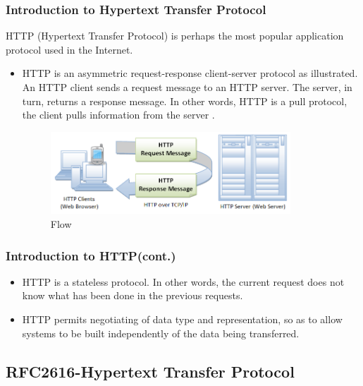 \documentclass{beamer}
\begin{document}
\begin{frame}
\frametitle{Introduction to Hypertext Transfer Protocol}
HTTP (Hypertext Transfer Protocol) is perhaps the most popular application protocol used in the Internet.\\


\begin{itemize}
\item HTTP is an asymmetric request-response client-server protocol as illustrated.  An HTTP client sends a request message to an HTTP server.  The server, in turn, returns a response message.  In other words, HTTP is a pull protocol, the client pulls information from the server . 
\begin{figure}[ht!]
\centering
\includegraphics[width=90mm]{HTTP1.jpg}
\caption{Flow}
\label{overflow}
\end{figure}
\end{itemize}
\end{frame}


\begin{frame}
\frametitle{Introduction to HTTP(cont.)}
\begin{itemize}
\item HTTP is a stateless protocol. In other words, the current request does not know what has been done in the previous requests.
\item HTTP permits negotiating of data type and representation, so as to allow systems to be built independently of the data being transferred.
\end{itemize}
\end{frame}

\subsection{RFC2616-Hypertext Transfer Protocol}
\end{document}
